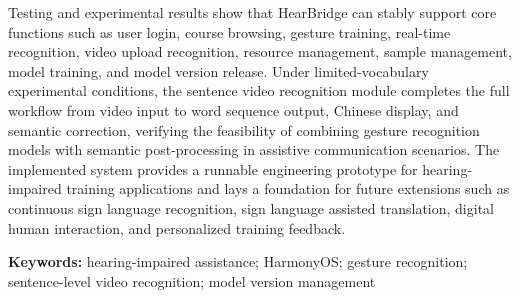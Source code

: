 Testing and experimental results show that HearBridge can stably support core functions such as user login, course browsing, gesture training, real-time recognition, video upload recognition, resource management, sample management, model training, and model version release. Under limited-vocabulary experimental conditions, the sentence video recognition module completes the full workflow from video input to word sequence output, Chinese display, and semantic correction, verifying the feasibility of combining gesture recognition models with semantic post-processing in assistive communication scenarios. The implemented system provides a runnable engineering prototype for hearing-impaired training applications and lays a foundation for future extensions such as continuous sign language recognition, sign language assisted translation, digital human interaction, and personalized training feedback.

\vspace{1em}

\noindent\textbf{Keywords:} hearing-impaired assistance; HarmonyOS; gesture recognition; sentence-level video recognition; model version management

